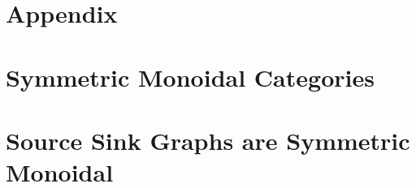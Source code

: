 \documentclass{llncs}
\begin{document}
 

\appendix

\section*{Appendix}
\label{sec:appendix}
\section{Symmetric Monoidal Categories}
\label{sec:symmetric_monoidal_categories}


\section{Source Sink Graphs are Symmetric Monoidal}
\label{sec:source_sink_graphs_are_symmetric_monoidal}

\end{document}
